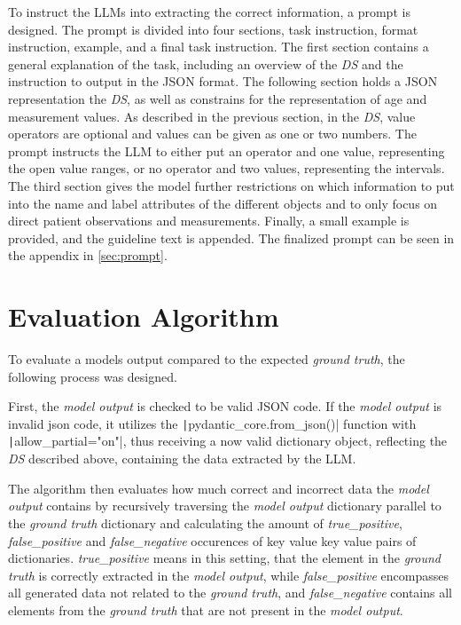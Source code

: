 \documentclass[bs, english]{stthesis}
\begin{document}
To instruct the LLMs into extracting the correct information, a prompt is designed. The prompt is divided into four sections, task instruction, format instruction, example, and a final task instruction.
The first section contains a general explanation of the task, including an overview of the \textit{DS} and the instruction to output in the JSON format. The following section holds a JSON representation the \textit{DS}, as well as constrains for the representation of age and measurement values. As described in the previous section, in the \textit{DS}, value operators are optional and values can be given as one or two numbers. The prompt instructs the LLM to either put an operator and one value, representing the open value ranges, or no operator and two values, representing the intervals. The third section gives the model further restrictions on which information to put into the name and label attributes of the different objects and to only focus on direct patient observations and measurements. Finally, a small example is provided, and the guideline text is appended.
The finalized prompt can be seen in the appendix in \cref{sec:prompt}.

\section{Evaluation Algorithm}
\label{sec:EvalAlg}

To evaluate a models output compared to the expected \textit{ground truth}, the following process was designed.

First, the \textit{model output} is checked to be valid JSON code. If the \textit{model output} is invalid json code, it utilizes the \texttt|pydantic_core.from_json()| function with \texttt|allow_partial="on"|, thus receiving a now valid dictionary object, reflecting the \textit{DS} described above, containing the data extracted by the LLM.

The algorithm then evaluates how much correct and incorrect data the \textit{model output} contains by recursively traversing the \textit{model output} dictionary parallel to the \textit{ground truth} dictionary and calculating the amount of \textit{true\_positive}, \textit{false\_positive} and \textit{false\_negative} occurences of key value key value pairs of dictionaries. \textit{true\_positive} means in this setting, that the element in the \textit{ground truth} is correctly extracted in the \textit{model output}, while \textit{false\_positive} encompasses all generated data not related to the \textit{ground truth}, and \textit{false\_negative} contains all elements from the \textit{ground truth} that are not present in the \textit{model output}. 
\end{document}
